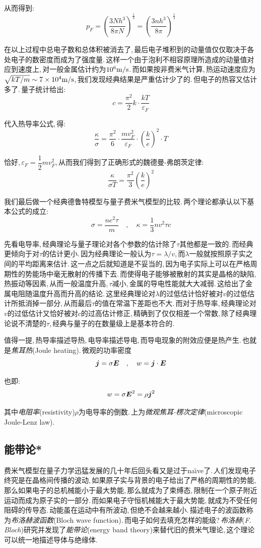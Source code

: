 从而得到:
\[p_F=(\frac{3Nh^3}{8\pi N})^{\frac{1}{3}}=(\frac{3nh^3}{8\pi})^{\frac{1}{3}}\]

在以上过程中总电子数和总体积被消去了,\,最后电子堆积到的动量值仅仅取决于各处电子的数密度而成为了强度量.\,这样一个由于泡利不相容原理所造成的动量值对应到速度上,\,对一般金属估计约为$10^6\rm m/s$.\,而如果按非费米气计算,\,热运动速度应为$\sqrt{kT/m}\sim 7\times 10^{4}\rm m/s$,\,我们发现经典结果是严重估计少了的.\,但电子的热容又估计多了.\,量子统计给出:
\[c=\frac{\pi^2}{2}k\cdot\frac{kT}{\varepsilon_F}\]

代入热导率公式,\,得:
\[\frac{\kappa}{\sigma}=\frac{\pi^2}{6}\cdot\frac{mv_F^2}{\varepsilon_F}\cdot(\frac{k}{e})^2\cdot T\]

恰好,\,$\varepsilon_F=\dfrac{1}{2}mv_F^2$,\,从而我们得到了正确形式的魏德曼-弗朗茨定律:
\[\frac{\kappa}{\sigma T}=\frac{\pi^2}{3}(\frac{k}{e})^2\]

我们最后做一个经典德鲁特模型与量子费米气模型的比较.\,两个理论都承认以下基本公式的成立:
\[\sigma=\frac{ne^2 \tau}{m}\quad ,\quad \kappa=\frac{1}{3}nv^2\tau c\]

先看电导率,\,经典理论与量子理论对各个参数的估计除了$\tau$其他都是一致的.\,而经典更倾向于对$\tau$的估计更小.\,因为经典理论一般认为$\tau=\lambda/v$,\,而$\lambda$一般就按照原子实之间的平均距离来估计.\,这一点之后就知道是不妥当的,\,因为电子实际上可以在严格周期性的势能场中毫无散射的传播下去.\,而使得电子能够被散射的其实是晶格的缺陷,\,热振动等因素,\,从而一般温度升高,\,$\tau$减小,\,金属的导电性能就大大减弱.\,这给出了金属电阻随温度升高而升高的结论.\,这里经典理论对$\lambda$的过低估计恰好被对$v$的过低估计所抵消掉一部分,\,从而最后$\tau$的值在常温下差距也不大.\,而对于热导率,\,经典理论对$v$的过低估计又恰好被对$c$的过高估计修正,\,精确到了仅仅相差一个常数,\,除了经典理论说不清楚的$\tau$,\,经典与量子的在数量级上是基本符合的.

值得一提,\,热导率描述导热,\,电导率描述导电,\,而导电现象的附效应便是热产生.\,也就是\emph{焦耳热}(Joule heating).\,微观的功率密度
\[\boldsymbol{j}=\sigma \boldsymbol{E}\quad ,\quad w=\boldsymbol{j}\cdot\boldsymbol{E}\]

也即:
\[w=\sigma \boldsymbol{E}^2=\rho \boldsymbol{j}^2\]

其中\emph{电阻率}(resistivity)$\rho$为电导率的倒数.\,上为\emph{微观焦耳-楞次定律}(microscopic Joule-Lenz law).

\subsection{能带论*}

费米气模型在量子力学迅猛发展的几十年后回头看又是过于na\"\i ve了.\,人们发现电子终究是在晶格间传播的波动,\,如果原子实与背景的电子给出了严格的周期性的势能,\,那么如果电子的总机械能小于最大势能,\,那么就成为了束缚态,\,限制在一个原子附近运动而成为原子实的一部分.\,而如果电子守恒机械能大于最大势能,\,就成为不受任何阻碍的传导态.\,动能虽在运动中有所波动,\,但绝不会越来越小.\,描述电子的波函数称为\emph{布洛赫波函数}(Bloch wave function).\,而电子如何去填充怎样的能级?\,\emph{布洛赫}({\it F. Bloch})研究并发现了\emph{能带论}(energy band theory)来替代旧的费米气理论,\,这个理论可以统一地描述导体与绝缘体.

